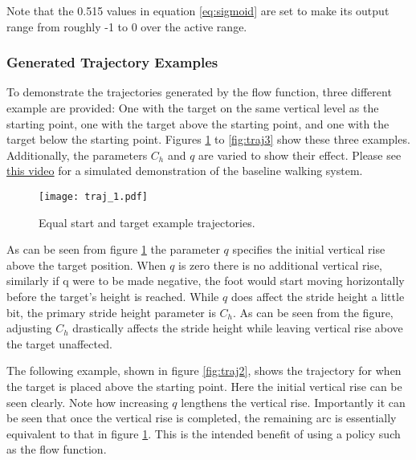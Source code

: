                 \noindent
                Note that the 0.515 values in equation \ref{eq:sigmoid} are set to make its output range from roughly -1 to 0 over the active range.
                
                \newpage
                \subsubsection{Generated Trajectory Examples}
                To demonstrate the trajectories generated by the flow function, three different example are provided: One with the target on the same vertical level as the starting point, one with the target above the starting point, and one with the target below the starting point. Figures \ref{fig:traj1} to \ref{fig:traj3} show these three examples. Additionally, the parameters \(C_h\) and \(q\) are varied to show their effect. Please see \href{https://youtu.be/UfGo_LZfF2c}{this video} for a simulated demonstration of the baseline walking system.
                \begin{figure}[h]
                    \centering
                    \texttt{[image: traj\_1.pdf]}
                    \caption{Equal start and target example trajectories.}
                    \label{fig:traj1}
                \end{figure}

                \noindent
                As can be seen from figure \ref{fig:traj1} the parameter \(q\) specifies the initial vertical rise above the target position. When \(q\) is zero there is no additional vertical rise, similarly if q were to be made negative, the foot would start moving horizontally before the target's height is reached. While \(q\) does affect the stride height a little bit, the primary stride height parameter is \(C_h\). As can be seen from the figure, adjusting \(C_h\) drastically affects the stride height while leaving vertical rise above the target unaffected.

                The following example, shown in figure \ref{fig:traj2}, shows the trajectory for when the target is placed above the starting point. Here the initial vertical rise can be seen clearly. Note how increasing \(q\) lengthens the vertical rise. Importantly it can be seen that once the vertical rise is completed, the remaining arc is essentially equivalent to that in figure \ref{fig:traj1}. This is the intended benefit of using a policy such as the flow function.
                
